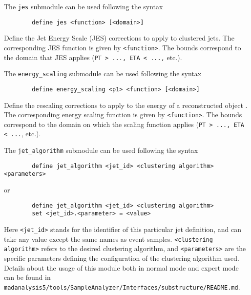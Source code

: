 \documentclass[a4paper]{article}
\begin{document}
\noindent The \verb+jes+ submodule can be used following the syntax
{\color{ao} \begin{verbatim}
		define jes <function> [<domain>]
\end{verbatim}}
Define the Jet Energy Scale (JES) corrections to apply to clustered jets. The corresponding JES function is given by {\tt <function>}. The bounds correspond to the domain that JES applies ({\tt PT > ..., ETA < ...,} etc.).

\noindent The \verb+energy_scaling+ submodule can be used following the syntax
{\color{ao} \begin{verbatim}
		define energy_scaling <p1> <function> [<domain>]
\end{verbatim}}
Define the rescaling corrections to apply to the energy of a reconstructed object {\tt <p1>}.
The corresponding energy scaling function is given by {\tt <function>}.
The bounds correspond to the domain on which the scaling function applies ({\tt PT > ..., ETA < ...}, etc.).

The \verb?jet_algorithm? submodule can be used following the syntax
{\color{ao} \begin{verbatim}
		define jet_algorithm <jet_id> <clustering algorithm> <parameters>
\end{verbatim}}
or
{\color{ao} \begin{verbatim}
		define jet_algorithm <jet_id> <clustering algorithm> 
		set <jet_id>.<parameter> = <value>
\end{verbatim}}
Here {\tt <jet\_id>} stands for the identifier of this particular jet definition, and can take any value except the same names as event samples. \texttt{<clustering algorithm>} refers to the desired clustering algorithm, and \texttt{<parameters>} are the specific parameters defining the configuration of the clustering algorithm used. Details about the usage of this module both in normal mode and expert mode can be found in {\tt madanalysis5/tools/SampleAnalyzer/Interfaces/substructure/README.md}.
\end{document}
